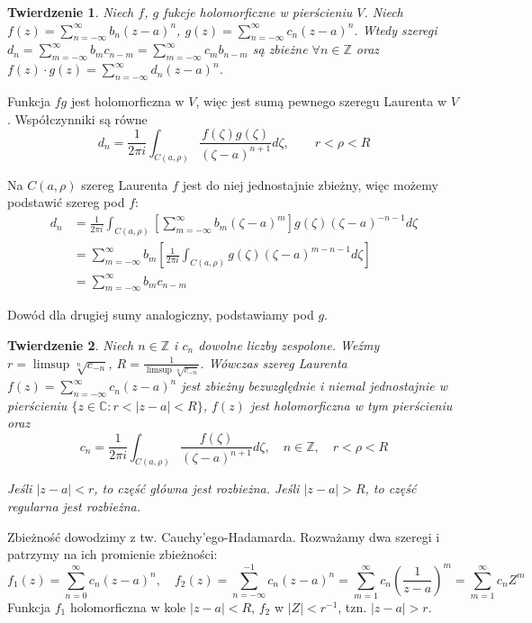 \documentclass[11pt]{article}
\newcommand{\abs}[1]{\left|#1\right|} %
\theoremstyle{plain}
\newtheorem*{theorem}{Twierdzenie}
\theoremstyle{definition}
\theoremstyle{remark}
\let\oldendproof\endproof
\renewenvironment{proof}[1][\proofname]{
  \oldproof[\textsc{\small #1}]
}{\oldendproof}
\begin{document}
\begin{theorem}
  Niech $f$, $g$ fukcje holomorficzne w pierścieniu $V$.
  Niech $ f(z) = \sum_{n=-\infty}^{\infty} b_n(z-a)^n $, $ g(z) = \sum_{n=-\infty}^{\infty} c_n(z-a)^n $.
  Wtedy szeregi $ d_n = \sum_{m=-\infty}^{\infty} b_{m}c_{n-m} = \sum_{m=-\infty}^{\infty} c_{m}b_{n-m} $ są zbieżne $ \forall n \in \mathbb{Z} $
  oraz $ f(z) \cdot g(z) = \sum_{n=-\infty}^{\infty} d_n(z-a)^n $.
\end{theorem}

\begin{proof}
  Funkcja $ fg $ jest holomorficzna w $V$, więc jest sumą pewnego szeregu Laurenta w $V$.
  Współczynniki są równe
  $$
    d_n =
    \frac{1}{2 \pi i} \int_{C(a, \rho)} \frac{f(\zeta)g(\zeta)}{(\zeta - a)^{n+1}} d\zeta,
    \qquad
    r < \rho < R
  $$

  Na $ C(a, \rho) $ szereg Laurenta $ f $ jest do niej jednostajnie zbieżny, więc możemy podstawić szereg pod $f$:
  \begin{align*}
    d_n &
    = \frac{1}{2 \pi i} \int_{C(a, \rho)} \left[ \sum_{m=-\infty}^{\infty} b_m(\zeta - a)^m \right] g(\zeta) (\zeta - a)^{-n-1} d\zeta \\ &
    = \sum_{m=-\infty}^{\infty} b_m \left[ \frac{1}{2 \pi i} \int_{C(a, \rho)} g(\zeta) (\zeta - a)^{m-n-1} d\zeta \right] \\ &
    = \sum_{m=-\infty}^{\infty} b_{m}c_{n-m}
  \end{align*}

  Dowód dla drugiej sumy analogiczny, podstawiamy pod $g$.
\end{proof}

\begin{theorem}
  Niech $ n \in \mathbb{Z} $ i $ c_n $ dowolne liczby zespolone.
  Weźmy $ r = \limsup \sqrt[n]{c_{-n}} $, $ R = \frac{1}{ \limsup \sqrt[n]{c_{-n}} } $.
  Wówczas szereg Laurenta $ f(z) = \sum_{n=-\infty}^{\infty} c_n(z-a)^{n} $ jest zbieżny bezwzględnie i niemal jednostajnie w pierścieniu $ \{ z \in \mathbb{C}: r < \abs{z-a} < R \} $,
  $ f(z) $ jest holomorficzna w tym pierścieniu oraz
  $$
    c_n = \frac{1}{2 \pi i} \int_{C(a, \rho)} \frac{f(\zeta)}{(\zeta - a)^{n+1}} d\zeta,
    \quad
    n \in \mathbb{Z},
    \quad
    r < \rho < R
  $$

  Jeśli $ \abs{z-a} < r $, to część główna jest rozbieżna.
  Jeśli $ \abs{z-a} > R $, to część regularna jest rozbieżna. 
\end{theorem}

\begin{proof}
  Zbieżność dowodzimy z tw. Cauchy'ego-Hadamarda. Rozważamy dwa szeregi i patrzymy na ich promienie zbieżności:
  $$
    f_1(z) = \sum_{n=0}^{\infty} c_n(z-a)^{n},
    \quad
    f_2(z) = \sum_{n=-\infty}^{-1} c_n(z-a)^{n} = \sum_{m=1}^{\infty} c_n \left(\frac{1}{z-a}\right)^{m} = \sum_{m=1}^{\infty} c_n Z^m
  $$
  Funkcja $ f_1 $ holomorficzna w kole $ \abs{z-a} < R $, $ f_2 $ w $ \abs{Z} < r^{-1} $, tzn. $ \abs{z-a} > r $.

\end{proof}
\end{document}
